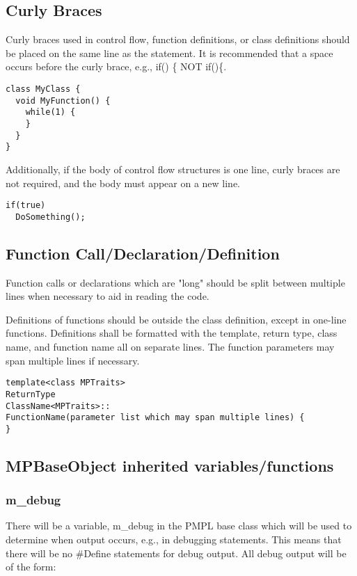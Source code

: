 \documentclass[12pt]{article}
\begin{document}
\subsection{Curly Braces}
Curly braces used in control flow, function definitions, or class definitions
should be placed on the same line as the statement. It is recommended that a
space occurs before the curly brace, e.g., if() \{ NOT if()\{.

\begin{lstlisting}
class MyClass {
  void MyFunction() {
    while(1) {
    }
  }
}
\end{lstlisting}

Additionally, if the body of control flow structures is one line, curly braces
are not required, and the body must appear on a new line.

\begin{lstlisting}
if(true)
  DoSomething();
\end{lstlisting}

\subsection{Function Call/Declaration/Definition}
Function calls or declarations which are "long" should be split between multiple
lines when necessary to aid in reading the code.

Definitions of functions should be outside the class definition, except in one-line
functions. Definitions shall be formatted with the template, return type, class
name, and function name all on separate lines. The function parameters may span
multiple lines if necessary.

\begin{lstlisting}
template<class MPTraits>
ReturnType
ClassName<MPTraits>::
FunctionName(parameter list which may span multiple lines) {
}
\end{lstlisting}

\subsection{MPBaseObject inherited variables/functions}

\subsubsection{m\_debug}

There will be a variable, m\_debug in the PMPL base class which will be used to
determine when output occurs, e.g., in debugging statements. This means that
there will be no \#Define statements for debug output. All debug output will be
of the form:
\end{document}
